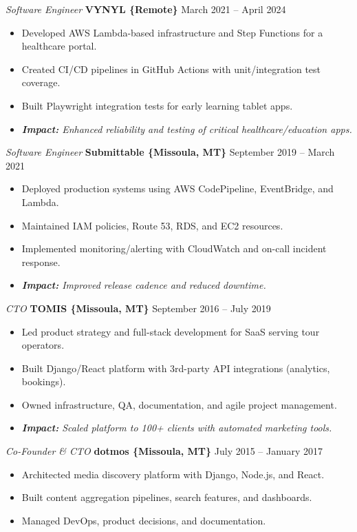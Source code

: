 \documentclass[10pt]{article}
\begin{document}
\textit{Software Engineer} \textbf{VYNYL \{Remote\}} \hfill March 2021 -- April 2024
\begin{itemize}
  \item Developed AWS Lambda-based infrastructure and Step Functions for a healthcare portal.
  \item Created CI/CD pipelines in GitHub Actions with unit/integration test coverage.
  \item Built Playwright integration tests for early learning tablet apps.
  \item \textit{\textbf{Impact:} Enhanced reliability and testing of critical healthcare/education apps.}
\end{itemize}

\textit{Software Engineer} \textbf{Submittable \{Missoula, MT\}} \hfill September 2019 -- March 2021
\begin{itemize}
  \item Deployed production systems using AWS CodePipeline, EventBridge, and Lambda.
  \item Maintained IAM policies, Route 53, RDS, and EC2 resources.
  \item Implemented monitoring/alerting with CloudWatch and on-call incident response.
  \item \textit{\textbf{Impact:} Improved release cadence and reduced downtime.}
\end{itemize}

\textit{CTO} \textbf{TOMIS \{Missoula, MT\}} \hfill September 2016 -- July 2019
\begin{itemize}
  \item Led product strategy and full-stack development for SaaS serving tour operators.
  \item Built Django/React platform with 3rd-party API integrations (analytics, bookings).
  \item Owned infrastructure, QA, documentation, and agile project management.
  \item \textit{\textbf{Impact:} Scaled platform to 100+ clients with automated marketing tools.}
\end{itemize}

\textit{Co-Founder \& CTO} \textbf{dotmos \{Missoula, MT\}} \hfill July 2015 -- January 2017
\begin{itemize}
  \item Architected media discovery platform with Django, Node.js, and React.
  \item Built content aggregation pipelines, search features, and dashboards.
  \item Managed DevOps, product decisions, and documentation.
\end{itemize}
\end{document}

